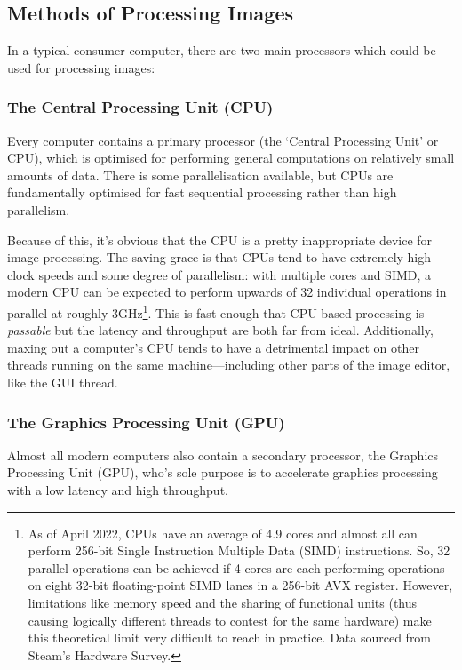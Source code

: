 \documentclass[12pt]{article}
\begin{document}
\subsection{Methods of Processing Images}\label{sec:compute-types}

In a typical consumer computer, there are two main processors which could be used for processing
images:

\subsubsection{The Central Processing Unit (CPU)}\label{sec:cpu}

Every computer contains a primary processor (the `Central Processing Unit' or CPU), which is
optimised for performing general computations on relatively small amounts of data.  There is some
parallelisation available, but CPUs are fundamentally optimised for fast sequential processing
rather than high parallelism.

Because of this, it's obvious that the CPU is a pretty inappropriate device for image processing.
The saving grace is that CPUs tend to have extremely high clock speeds and some degree of
parallelism: with multiple cores and SIMD, a modern CPU can be expected to perform upwards of 32
individual operations in parallel at roughly 3GHz\footnote{As of April 2022, CPUs have an average of
4.9 cores and almost all can perform 256-bit Single Instruction Multiple Data (SIMD) instructions.
So, 32 parallel operations can be achieved if 4 cores are each performing operations on eight 32-bit
floating-point SIMD lanes in a 256-bit AVX register.  However, limitations like memory speed and the
sharing of functional units (thus causing logically different threads to contest for the same
hardware) make this theoretical limit very difficult to reach in practice.  Data sourced from
Steam's Hardware Survey.}.  This is fast enough that CPU-based processing is \emph{passable} but the
latency and throughput are both far from ideal.  Additionally, maxing out a computer's CPU tends to
have a detrimental impact on other threads running on the same machine---including other parts of
the image editor, like the GUI thread.

\subsubsection{The Graphics Processing Unit (GPU)}\label{sec:gpu}

Almost all modern computers also contain a secondary processor, the Graphics Processing Unit (GPU),
who's sole purpose is to accelerate graphics processing with a low latency and high throughput.
\end{document}
